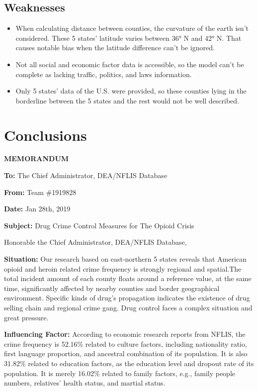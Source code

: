 \documentclass{mcmthesis}
\begin{document}
\subsection{Weaknesses}
\begin{itemize}
	\item When calculating distance between counties, the curvature of the earth isn’t considered. These 5 states’ latitude varies between 36° N and 42° N. That causes notable bias when the latitude difference can’t be ignored.
	\item Not all social and economic factor data is accessible, so the model can’t be complete as lacking traffic, politics, and laws information.
	\item Only 5 states’ data of the U.S. were provided, so these counties lying in the borderline between the 5 states and the rest would not be well described.
\end{itemize}

\section{Conclusions}

\newpage
\Large\textbf{MEMORANDUM}

\normalsize \textbf{To:} The Chief Administrator, DEA/NFLIS Database

\textbf{From:} Team \#1919828

\textbf{Date:} Jan 28th, 2019

\textbf{Subject:} Drug Crime Control Measures for The Opioid Crisis

Honorable the Chief Administrator, DEA/NFLIS Database,

\textbf{Situation:} Our research based on east-northern 5 states reveals that American opioid and heroin related crime frequency is strongly regional and spatial.The total incident amount of each county floats around a reference value, at the same time, significantly affected by nearby counties and border geographical environment. Specific kinds of drug's propagation indicates the existence of drug selling chain and regional crime gang. Drug control faces a complex situation and great pressure.

\textbf{Influencing Factor:} According to economic research reports from NFLIS, the crime frequency is 52.16\% related to culture factors, including nationality ratio, first language proportion, and ancestral combination of its population. It is also 31.82\% related to education factors, as the education level and dropout rate of its population. It is merely 16.02\% related to family factors, e.g., family people numbers, relatives' health status, and martial status.
\end{document}

